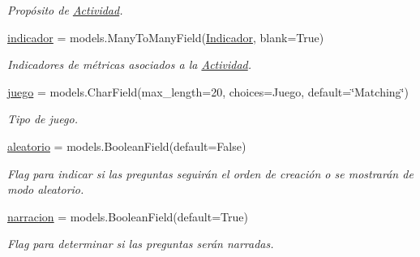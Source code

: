 \begin{DoxyCompactItemize}
\begin{DoxyCompactList}\small\item\em Propósito de \hyperlink{classappEmotionIOT_1_1models_1_1Actividad}{Actividad}. \end{DoxyCompactList}\item 
\hyperlink{classappEmotionIOT_1_1models_1_1Actividad_ac911a5fa06727ad450ed211022b5afeb}{indicador} = models.\+Many\+To\+Many\+Field(\hyperlink{classappEmotionIOT_1_1models_1_1Indicador}{Indicador}, blank=True)\hypertarget{classappEmotionIOT_1_1models_1_1Actividad_ac911a5fa06727ad450ed211022b5afeb}{}\label{classappEmotionIOT_1_1models_1_1Actividad_ac911a5fa06727ad450ed211022b5afeb}

\begin{DoxyCompactList}\small\item\em Indicadores de métricas asociados a la \hyperlink{classappEmotionIOT_1_1models_1_1Actividad}{Actividad}. \end{DoxyCompactList}\item 
\hyperlink{classappEmotionIOT_1_1models_1_1Actividad_aa7c2ddce957e2eac3159ba2d636c5c41}{juego} = models.\+Char\+Field(max\+\_\+length=20, choices=Juego, default=\char`\"{}Matching\char`\"{})\hypertarget{classappEmotionIOT_1_1models_1_1Actividad_aa7c2ddce957e2eac3159ba2d636c5c41}{}\label{classappEmotionIOT_1_1models_1_1Actividad_aa7c2ddce957e2eac3159ba2d636c5c41}

\begin{DoxyCompactList}\small\item\em Tipo de juego. \end{DoxyCompactList}\item 
\hyperlink{classappEmotionIOT_1_1models_1_1Actividad_afe96923883d86fc0f8df6131b9dea527}{aleatorio} = models.\+Boolean\+Field(default=False)\hypertarget{classappEmotionIOT_1_1models_1_1Actividad_afe96923883d86fc0f8df6131b9dea527}{}\label{classappEmotionIOT_1_1models_1_1Actividad_afe96923883d86fc0f8df6131b9dea527}

\begin{DoxyCompactList}\small\item\em Flag para indicar si las preguntas seguirán el orden de creación o se mostrarán de modo aleatorio. \end{DoxyCompactList}\item 
\hyperlink{classappEmotionIOT_1_1models_1_1Actividad_aea09df547b51a459db33cde1ea27d8bb}{narracion} = models.\+Boolean\+Field(default=True)\hypertarget{classappEmotionIOT_1_1models_1_1Actividad_aea09df547b51a459db33cde1ea27d8bb}{}\label{classappEmotionIOT_1_1models_1_1Actividad_aea09df547b51a459db33cde1ea27d8bb}

\begin{DoxyCompactList}\small\item\em Flag para determinar si las preguntas serán narradas. \end{DoxyCompactList}\end{DoxyCompactItemize}



